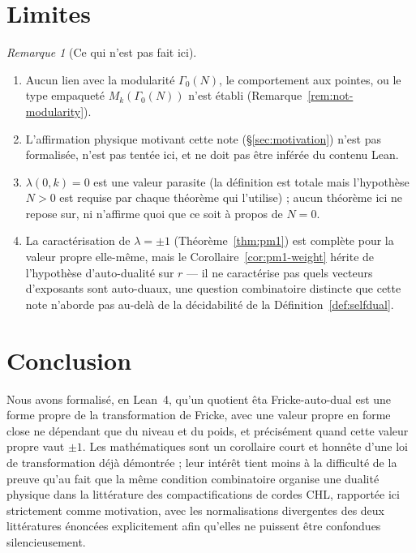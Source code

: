 \documentclass[11pt, a4paper]{article}
\theoremstyle{remark}
\newtheorem{remark}[theorem]{Remarque}
\begin{document}
\section{Limites}\label{sec:limitations}

\begin{remark}[Ce qui n'est pas fait ici]
\leavevmode
\begin{enumerate}[label=(\alph*)]
  \item Aucun lien avec la modularité $\Gamma_0(N)$, le comportement aux pointes, ou le type
    empaqueté $M_k(\Gamma_0(N))$ n'est établi (Remarque~\ref{rem:not-modularity}).
  \item L'affirmation physique motivant cette note (\S\ref{sec:motivation}) n'est pas formalisée,
    n'est pas tentée ici, et ne doit pas être inférée du contenu Lean.
  \item $\lambda(0,k)=0$ est une valeur parasite (la définition est totale mais l'hypothèse $N>0$
    est requise par chaque théorème qui l'utilise) ; aucun théorème ici ne repose sur, ni
    n'affirme quoi que ce soit à propos de $N=0$.
  \item La caractérisation de $\lambda=\pm1$ (Théorème~\ref{thm:pm1}) est complète pour la valeur
    propre elle-même, mais le Corollaire~\ref{cor:pm1-weight} hérite de l'hypothèse
    d'auto-dualité sur $r$ --- il ne caractérise pas quels vecteurs d'exposants sont auto-duaux,
    une question combinatoire distincte que cette note n'aborde pas au-delà de la décidabilité de
    la Définition~\ref{def:selfdual}.
\end{enumerate}
\end{remark}

\section{Conclusion}

Nous avons formalisé, en Lean~4, qu'un quotient êta Fricke-auto-dual est une forme propre de la
transformation de Fricke, avec une valeur propre en forme close ne dépendant que du niveau et du
poids, et précisément quand cette valeur propre vaut $\pm1$. Les mathématiques sont un corollaire
court et honnête d'une loi de transformation déjà démontrée ; leur intérêt tient moins à la
difficulté de la preuve qu'au fait que la même condition combinatoire organise une dualité
physique dans la littérature des compactifications de cordes CHL, rapportée ici strictement comme
motivation, avec les normalisations divergentes des deux littératures énoncées explicitement afin
qu'elles ne puissent être confondues silencieusement.
\end{document}
